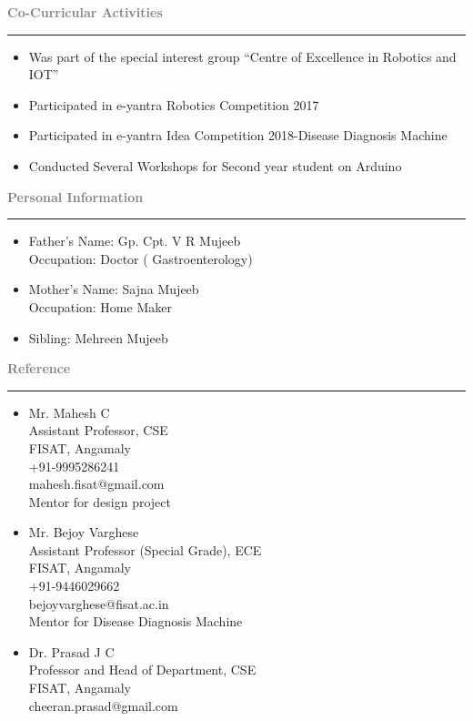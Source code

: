 \documentclass[11.5pt,a4paper]{article}
\begin{document}
\textbf{\textcolor{gray}{\huge Co-Curricular Activities}}\\ \hrule
\begin{itemize}
\item Was part of the special interest group “Centre of Excellence in Robotics and IOT”
\item Participated in e-yantra Robotics Competition 2017
\item Participated in e-yantra Idea Competition 2018-Disease Diagnosis Machine
\item Conducted Several Workshops for Second year student on Arduino

\end{itemize}


\textbf{\textcolor{gray}{\huge Personal Information}}\\ \hrule
\begin{itemize}
\item Father’s Name: Gp. Cpt. V R Mujeeb\\
Occupation: Doctor ( Gastroenterology)
\item Mother’s Name: Sajna Mujeeb\\
Occupation: Home Maker
\item Sibling: Mehreen Mujeeb
\end{itemize}

\textbf{\textcolor{gray}{\huge Reference}}\\ \hrule
\begin{itemize}
\item Mr. Mahesh C\\
 Assistant Professor, CSE\\
           FISAT, Angamaly\\
	 +91-9995286241\\
	 mahesh.fisat@gmail.com\\
	 Mentor for design project\\
\item  Mr. Bejoy Varghese\\
	Assistant Professor (Special Grade), ECE\\
	FISAT, Angamaly\\
	+91-9446029662\\
	bejoyvarghese@fisat.ac.in\\
	Mentor for Disease Diagnosis Machine\\
\item  Dr. Prasad J C\\
	Professor and Head of Department, CSE\\
	FISAT, Angamaly\\
	cheeran.prasad@gmail.com\\
\end{itemize}
\end{document}
